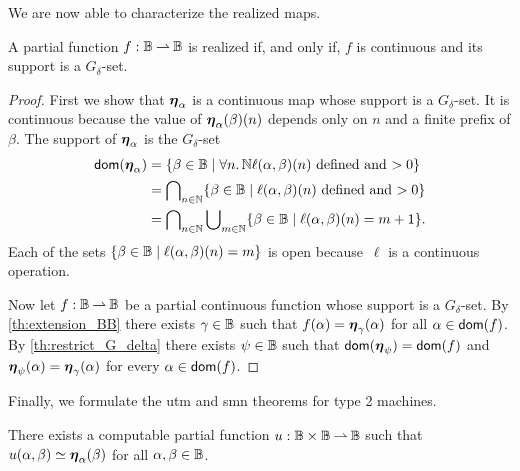 We are now able to characterize the realized maps.

\begin{theorem}
  A partial function $f: \mathbb{B} \mathbin{\rightharpoonup} \mathbb{B}$ is realized if, and only
  if, $f$ is continuous and its support is a $G_\delta$-set.
\end{theorem}

\begin{proof}
  First we show that $\text{\boldmath{$\eta$}}_\alpha$ is a continuous map whose support
  is a $G_\delta$-set. It is continuous because the value of
  $\text{\boldmath{$\eta$}}_{\alpha}(\beta)(n)$ depends only on $n$ and a finite prefix of
  $\beta$. The support of $\text{\boldmath{$\eta$}}_\alpha$ is the $G_\delta$-set
  \begin{align*}
    \mathsf{dom}(\text{\boldmath{$\eta$}}_\alpha)
    &= \{\beta \in \mathbb{B} \mid
      \forall n .\,{\mathbb{N}}{
        \ell(\alpha, \beta)(n) \ \text{defined and $> 0$}}\} \\
    &= \bigcap\nolimits_{n \in \mathbb{N}}
      \{\beta \in \mathbb{B} \mid
        \ell(\alpha, \beta)(n) \ \text{defined and $> 0$}\} \\
    &=  \bigcap\nolimits_{n \in \mathbb{N}}
        \bigcup\nolimits_{m \in \mathbb{N}}
          \{\beta \in \mathbb{B} \mid
          \ell(\alpha, \beta)(n) = m + 1\}.
  \end{align*}
  Each of the sets $\{\beta \in \mathbb{B} \mid \ell(\alpha, \beta)(n) = m\}$ is open because~$\ell$ is a continuous operation.
  
  Now let $f: \mathbb{B} \mathbin{\rightharpoonup} \mathbb{B}$ be a partial continuous function
  whose support is a $G_\delta$-set. By \cref{th:extension_BB}
  there exists $\gamma \in \mathbb{B}$ such that $f(\alpha) =
  \text{\boldmath{$\eta$}}_{\gamma}(\alpha)$ for all $\alpha \in \mathsf{dom}(f)$. By
  \cref{th:restrict_G_delta} there exists $\psi \in \mathbb{B}$ such
  that $\mathsf{dom}(\text{\boldmath{$\eta$}}_\psi) = \mathsf{dom}(f)$ and $\text{\boldmath{$\eta$}}_{\psi}(\alpha) =
  \text{\boldmath{$\eta$}}_{\gamma}(\alpha)$ for every $\alpha \in \mathsf{dom}(f)$.
\end{proof}

Finally, we formulate the utm and smn theorems for type 2 machines.

\begin{theorem}
  \label{th:type-2-utm}%
  There exists a computable partial function $u : \mathbb{B} \times
  \mathbb{B} \mathbin{\rightharpoonup} \mathbb{B}$ such that $u(\alpha, \beta) \simeq
  \text{\boldmath{$\eta$}}_{\alpha}(\beta)$ for all $\alpha, \beta \in \mathbb{B}$.
\end{theorem}


